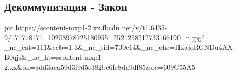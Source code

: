  
 
 
 
 

\subsection{Декоммунизация - Закон}
\label{sec:09_04_2021.fb.vjatrovich_vladimir.1.dekomunizacia_kartinka}

\ifcmt
  pic https://scontent-mxp1-2.xx.fbcdn.net/v/t1.6435-9/171778171_10208978725180955_2521258212733166190_n.jpg?_nc_cat=111&ccb=1-3&_nc_sid=730e14&_nc_ohc=HxajoRGNDu4AX-B0qjs&_nc_ht=scontent-mxp1-2.xx&oh=add3aca59d3f9d5e382be6fe8da9df85&oe=609C55A5
\fi

